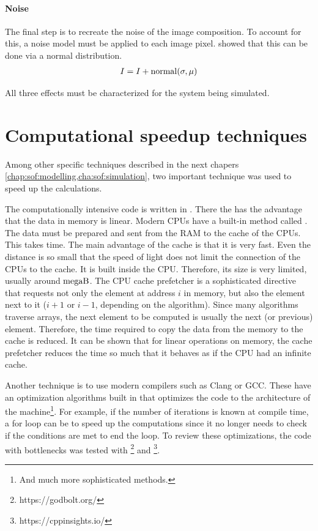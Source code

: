 \paragraph{Noise}
The final step is to recreate the noise of the image composition.
To account for this, a noise model must be applied to each image pixel.
\cite{Wiese:887678} showed that this can be done via a normal distribution.
%
\begin{align}
    I = I + \operatorname{normal}(\sigma, \mu)
\end{align}
%
\par
%
All three effects must be characterized for the system being simulated.
%
%
%
\section{Computational speedup techniques}
%
Among other specific techniques described in the next chapers \cref{chap:sof:modelling,cha:sof:simulation}, two important technique was used to speed up the calculations.
\par
%
The computationally intensive code is written in \cpp{}.
There the  has the advantage that the data in memory is linear.
Modern \acp{CPU} have a built-in method called .
The data must be prepared and sent from the \ac{RAM} to the cache of the \acp{CPU}.
This takes time.
The main advantage of the cache is that it is very fast.
Even the distance is so small that the speed of light does not limit the connection of the \acp{CPU} to the cache.
It is built inside the \ac{CPU}.
Therefore, its size is very limited, usually around $\si{mega\byte}$.
The \ac{CPU} cache prefetcher is a sophisticated directive that requests not only the element at address $i$ in memory, but also the element next to it ($i+1$ or $i-1$, depending on the algorithm).
Since many algorithms traverse arrays, the next element to be computed is usually the next (or previous) element.
Therefore, the time required to copy the data from the memory to the cache is reduced.
It can be shown that for linear operations on memory, the cache prefetcher reduces the time so much that it behaves as if the \ac{CPU} had an infinite cache.
\par
%
Another technique is to use modern compilers such as Clang or GCC.
These have an optimization algorithms built in that optimizes the code to the architecture of the machine\footnote{And much more sophisticated methods.}.
For example, if the number of iterations is known at compile time, a for loop can be  to speed up the computations since it no longer needs to check if the conditions are met to end the loop.
To review these optimizations, the code with bottlenecks was tested with \footnote{https://godbolt.org/} and \footnote{https://cppinsights.io/}.
%
